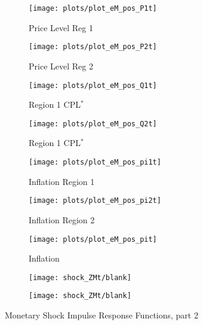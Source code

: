 \documentclass[../thesis.tex]{subfiles}
\begin{document}
\begin{figure}[h!]
	\begin{subfigure}[b]{0.26\textwidth}
		\centering
		\texttt{[image: plots/plot\_eM\_pos\_P1t]}
		\caption{\footnotesize Price Level Reg 1}
		\label{fig:ZMt-P1t}
	\end{subfigure}
	\hfill
	\begin{subfigure}[b]{0.26\textwidth}
		\centering
		\texttt{[image: plots/plot\_eM\_pos\_P2t]}
		\caption{\footnotesize Price Level Reg 2}
		\label{fig:ZMt-P2t}
	\end{subfigure}
	\hfill
	\begin{subfigure}[b]{0.26\textwidth}
		\centering
		\texttt{[image: plots/plot\_eM\_pos\_Q1t]}
		\caption{\footnotesize Region 1 CPL$^{\ast}$}
		\label{fig:ZMt-Q1t}
	\end{subfigure}
	\hfill		
	\vspace*{0.5cm}
	
	
	\begin{subfigure}[b]{0.26\textwidth}
		\centering
		\texttt{[image: plots/plot\_eM\_pos\_Q2t]}
		\caption{\footnotesize Region 1 CPL$^{\ast}$}
		\label{fig:ZMt-Q2t}
	\end{subfigure}
	\hfill
	\begin{subfigure}[b]{0.26\textwidth}
		\centering
		\texttt{[image: plots/plot\_eM\_pos\_pi1t]}
		\caption{\footnotesize Inflation Region 1}
		\label{fig:ZMt-pi1t}
	\end{subfigure}
	\hfill
	\begin{subfigure}[b]{0.26\textwidth}
		\centering
		\texttt{[image: plots/plot\_eM\_pos\_pi2t]}
		\caption{\footnotesize Inflation Region 2}
		\label{fig:ZMt-pi2t}
	\end{subfigure}
	\hfill
	\vspace*{0.5cm}
	
	
	\begin{subfigure}[b]{0.26\textwidth}
		\centering
		\texttt{[image: plots/plot\_eM\_pos\_pit]}
		\caption{\footnotesize Inflation}
		\label{fig:ZMt-pit}
	\end{subfigure}
	\hfill
	\begin{subfigure}[b]{0.26\textwidth}
		\centering
		\texttt{[image: shock\_ZMt/blank]}
	\end{subfigure}
	\hfill
	\begin{subfigure}[b]{0.26\textwidth}
		\centering
		\texttt{[image: shock\_ZMt/blank]}
	\end{subfigure}
	\hfill
	\vspace*{0.5cm}		
	\caption{Monetary Shock Impulse Response Functions, part 2}
	\label{fig:ZMt-irf2}
\end{figure}
\end{document}
